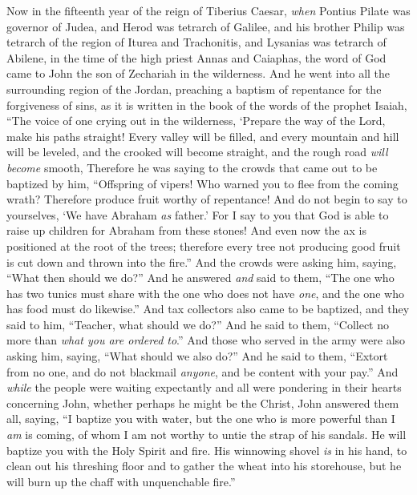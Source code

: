 \begin{biblechapter} %
 Now in the fifteenth year of the reign of Tiberius Caesar, \textit{when} Pontius Pilate was governor of Judea, and Herod was tetrarch of Galilee, and his brother Philip was tetrarch of the region of Iturea and Trachonitis, and Lysanias was tetrarch of Abilene,
\verse in the time of the high priest Annas and Caiaphas, the word of God came to John the son of Zechariah in the wilderness.
\verse And he went into all the surrounding region of the Jordan, preaching a baptism of repentance for the forgiveness of sins,
\verse as it is written in the book of the words of the prophet Isaiah,
\verse “The voice of one crying out in the wilderness, 
‘Prepare the way of the Lord, 
make his paths straight!
\verse Every valley will be filled, 
and every mountain and hill will be leveled, 
and the crooked will become straight, 
and the rough road \textit{will become} smooth,
\verse Therefore he was saying to the crowds that came out to be baptized by him, “Offspring of vipers! Who warned you to flee from the coming wrath?
\verse Therefore produce fruit worthy of repentance! And do not begin to say to yourselves, ‘We have Abraham \textit{as} father.’ For I say to you that God is able to raise up children for Abraham from these stones!
\verse And even now the ax is positioned at the root of the trees; therefore every tree not producing good fruit is cut down and thrown into the fire.”
\verse And the crowds were asking him, saying, “What then should we do?”
\verse And he answered \textit{and} said to them, “The one who has two tunics must share with the one who does not have \textit{one}, and the one who has food must do likewise.”
\verse And tax collectors also came to be baptized, and they said to him, “Teacher, what should we do?”
\verse And he said to them, “Collect no more than \textit{what you are ordered to}.”
\verse And those who served in the army were also asking him, saying, “What should we also do?” And he said to them, “Extort from no one, and do not blackmail \textit{anyone}, and be content with your pay.”
\verse And \textit{while} the people were waiting expectantly and all were pondering in their hearts concerning John, whether perhaps he might be the Christ,
\verse John answered them all, saying, “I baptize you with water, but the one who is more powerful than I \textit{am} is coming, of whom I am not worthy to untie the strap of his sandals. He will baptize you with the Holy Spirit and fire.
\verse His winnowing shovel \textit{is} in his hand, to clean out his threshing floor and to gather the wheat into his storehouse, but he will burn up the chaff with unquenchable fire.”

\end{biblechapter}
